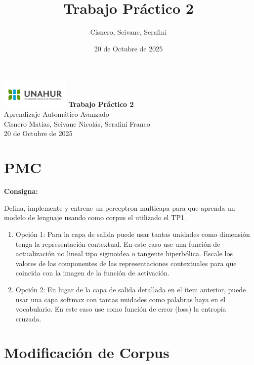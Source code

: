 \documentclass{beamer}
\title{Trabajo Práctico 2}
\author{Cisnero, Seivane, Serafini}
\date{20 de Octubre de 2025}
\begin{document}
\begin{frame}
	\centering
	\includegraphics[width=0.25\textwidth]{UNAHUR (2)}
	\vfill
	{\huge \textbf{Trabajo Práctico 2}}\\[0.2cm]
	{\Large Aprendizaje Automático Avanzado}\\
	\vfill
	{\large Cisnero Matias, Seivane Nicolás, Serafini Franco}\\
	{\small 20 de Octubre de 2025}
\end{frame}

\section{PMC}

\begin{frame}[fragile]
	\begin{center}
		\textcolor{unahurverde}{\textbf{Consigna:}}
	\end{center}
	\justifying
	Defina, implemente y entrene un perceptron multicapa para que aprenda un modelo de lenguaje usando como corpus el utilizado el TP1.
	
	\begin{enumerate}
		\item Opción 1: Para la capa de salida puede usar tantas unidades como dimensión tenga la representación contextual. En este caso use una función de actualización no lineal tipo sigmoidea o tangente hiperbólica. Escale los valores de las componentes de las representaciones contextuales para que coincida con la imagen de la función de activación.
		
		\item Opción 2: En lugar de la capa de salida detallada en el ítem anterior, puede usar una capa softmax con tantas unidades como palabras haya en el vocabulario. En este caso use como función de error (loss) la entropía cruzada.
	\end{enumerate}
\end{frame}

\section{Modificación de Corpus}
\end{document}
